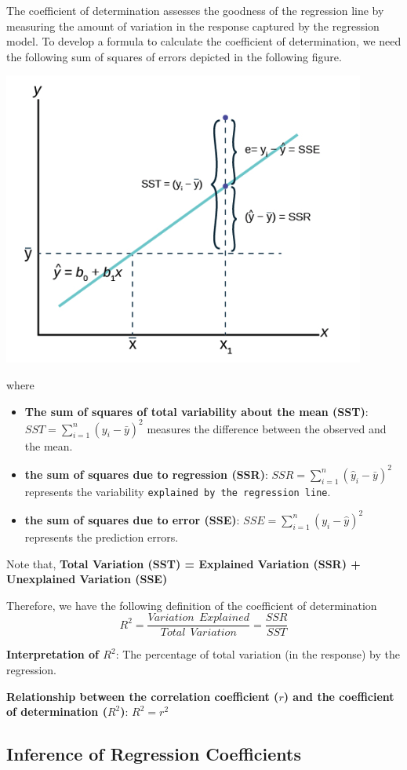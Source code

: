 \documentclass[
]{book}
\providecommand{\tightlist}{%
  \setlength{\itemsep}{0pt}\setlength{\parskip}{0pt}}
\begin{document}
The coefficient of determination assesses the goodness of the regression line by measuring the amount of variation in the response captured by the regression model. To develop a formula to calculate the coefficient of determination, we need the following sum of squares of errors depicted in the following figure.

\begin{center}\includegraphics[width=0.5\linewidth]{week12/Rsq} \end{center}

where

\begin{itemize}
\tightlist
\item
  \textbf{The sum of squares of total variability about the mean (SST)}: \(SST = \sum_{i=1}^n(y_i-\bar{y})^2\) measures the difference between the observed and the mean.
\item
  \textbf{the sum of squares due to regression (SSR)}: \(SSR = \sum_{i=1}^n(\hat{y}_i-\bar{y})^2\) represents the variability \texttt{explained\ by\ the\ regression\ line}.
\item
  \textbf{the sum of squares due to error (SSE)}: \(SSE = \sum_{i=1}^n(y_i-\hat{y})^2\) represents the prediction errors.
\end{itemize}

Note that, \textbf{Total Variation (SST) = Explained Variation (SSR) + Unexplained Variation (SSE)}

Therefore, we have the following definition of the coefficient of determination
\[
R^2 = \frac{Variation \ \ Explained}{Total \ \ Variation} = \frac{SSR}{SST}
\]

\textbf{Interpretation of \(R^2\)}: The percentage of total variation (in the response) by the regression.

\textbf{Relationship between the correlation coefficient (\(r\)) and the coefficient of determination (\(R^2\))}: \(R^2 = r^2\)

\hypertarget{inference-of-regression-coefficients}{%
\subsection{Inference of Regression Coefficients}\label{inference-of-regression-coefficients}}
\end{document}

